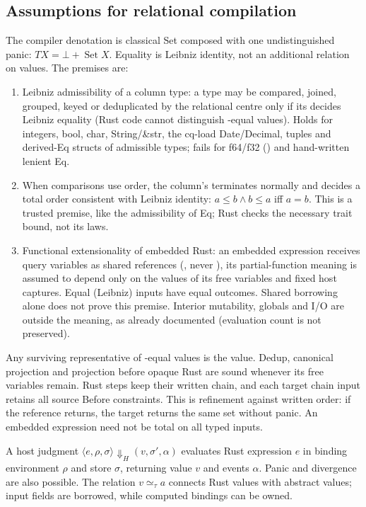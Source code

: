 \subsection{Assumptions for relational compilation}
The compiler denotation is classical Set composed with one undistinguished
panic: $T X=\bot+\operatorname{Set}X$. Equality is Leibniz identity, not an
additional relation on values. The premises are:
\begin{enumerate}
\item Leibniz admissibility of a column type: a type may be compared, joined,
grouped, keyed or deduplicated by the relational centre only if its \code{==}
decides Leibniz equality (Rust code cannot distinguish \code{==}-equal values).
Holds for integers, bool, char, String/\&str, the cq-load Date/Decimal, tuples
and derived-Eq structs of admissible types; fails for f64/f32
() and hand-written lenient Eq.
\item When comparisons use order, the column's  terminates normally
and decides a total order consistent with Leibniz identity:
$a\leq b\land b\leq a$ iff $a=b$. This is a trusted premise, like the
admissibility of Eq; Rust checks the necessary trait bound, not its laws.
\item Functional extensionality of embedded Rust: an embedded expression
receives query variables as shared references (, never ),
its partial-function meaning is assumed to depend only on the values of its
free variables and fixed host captures. Equal (Leibniz) inputs have equal
outcomes. Shared borrowing alone does not prove this premise. Interior mutability, globals and I/O are outside the
meaning, as already documented (evaluation count is not preserved).
\end{enumerate}
Any surviving representative of \code{==}-equal values is the value. Dedup,
canonical projection and projection before opaque Rust are sound whenever its
free variables remain. Rust steps keep their written chain, and each target
chain input retains all source Before constraints. This is refinement against
written order: if the reference returns, the target returns the same set
without panic. An embedded expression need not be total on all typed inputs.

A host judgment
$\langle e,\rho,\sigma\rangle\Downarrow_H(v,\sigma',\alpha)$
evaluates Rust expression $e$ in binding environment $\rho$ and store $\sigma$,
returning value $v$ and events $\alpha$. Panic and divergence are also possible.
The relation $v\simeq_\tau a$ connects Rust values with abstract values;
input fields are borrowed, while computed bindings can be owned.

